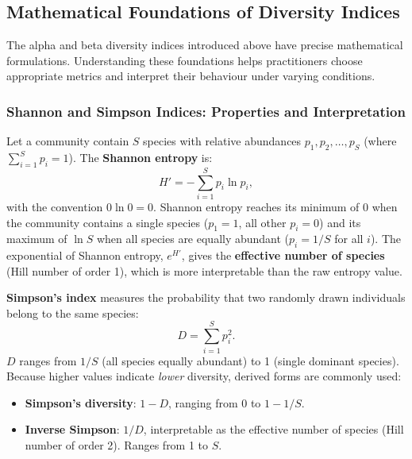 \subsection{Mathematical Foundations of Diversity Indices}
\label{subsec:metagenomics:diversity_math}

The alpha and beta diversity indices introduced above have precise mathematical formulations. Understanding these foundations helps practitioners choose appropriate metrics and interpret their behaviour under varying conditions.

\subsubsection{Shannon and Simpson Indices: Properties and Interpretation}

Let a community contain $S$ species with relative abundances $p_1, p_2, \ldots, p_S$ (where $\sum_{i=1}^{S} p_i = 1$). The \textbf{Shannon entropy} is:
\begin{equation}
\label{eq:metagenomics:shannon}
H' = -\sum_{i=1}^{S} p_i \ln p_i,
\end{equation}
with the convention $0 \ln 0 = 0$. Shannon entropy reaches its minimum of 0 when the community contains a single species ($p_1 = 1$, all other $p_i = 0$) and its maximum of $\ln S$ when all species are equally abundant ($p_i = 1/S$ for all $i$). The exponential of Shannon entropy, $e^{H'}$, gives the \textbf{effective number of species} (Hill number of order 1), which is more interpretable than the raw entropy value.

\textbf{Simpson's index} measures the probability that two randomly drawn individuals belong to the same species:
\begin{equation}
\label{eq:metagenomics:simpson}
D = \sum_{i=1}^{S} p_i^2.
\end{equation}
$D$ ranges from $1/S$ (all species equally abundant) to 1 (single dominant species). Because higher values indicate \emph{lower} diversity, derived forms are commonly used:
\begin{itemize}[nosep]
  \item \textbf{Simpson's diversity}: $1 - D$, ranging from 0 to $1 - 1/S$.
  \item \textbf{Inverse Simpson}: $1/D$, interpretable as the effective number of species (Hill number of order 2). Ranges from 1 to $S$.
\end{itemize}

